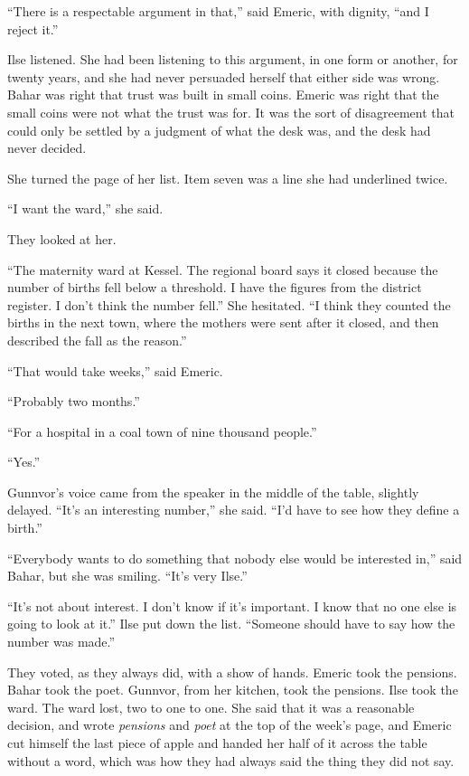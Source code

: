 ``There is a respectable argument in that,'' said Emeric, with dignity, ``and I reject it.''

Ilse listened. She had been listening to this argument, in one form or another, for twenty years, and she had never persuaded herself that either side was wrong. Bahar was right that trust was built in small coins. Emeric was right that the small coins were not what the trust was for. It was the sort of disagreement that could only be settled by a judgment of what the desk was, and the desk had never decided.

She turned the page of her list. Item seven was a line she had underlined twice.

``I want the ward,'' she said.

They looked at her.

``The maternity ward at Kessel. The regional board says it closed because the number of births fell below a threshold. I have the figures from the district register. I don't think the number fell.'' She hesitated. ``I think they counted the births in the next town, where the mothers were sent after it closed, and then described the fall as the reason.''

``That would take weeks,'' said Emeric.

``Probably two months.''

``For a hospital in a coal town of nine thousand people.''

``Yes.''

Gunnvor's voice came from the speaker in the middle of the table, slightly delayed. ``It's an interesting number,'' she said. ``I'd have to see how they define a birth.''

``Everybody wants to do something that nobody else would be interested in,'' said Bahar, but she was smiling. ``It's very Ilse.''

``It's not about interest. I don't know if it's important. I know that no one else is going to look at it.'' Ilse put down the list. ``Someone should have to say how the number was made.''

They voted, as they always did, with a show of hands. Emeric took the pensions. Bahar took the poet. Gunnvor, from her kitchen, took the pensions. Ilse took the ward. The ward lost, two to one to one. She said that it was a reasonable decision, and wrote \emph{pensions} and \emph{poet} at the top of the week's page, and Emeric cut himself the last piece of apple and handed her half of it across the table without a word, which was how they had always said the thing they did not say.

